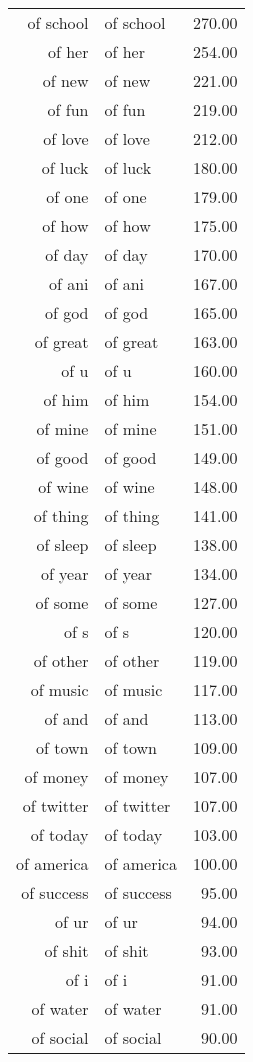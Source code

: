 \begin{table}[ht]
\begin{tabular}{rlr}
  of school & of school & 270.00 \\ 
  of her & of her & 254.00 \\ 
  of new & of new & 221.00 \\ 
  of fun & of fun & 219.00 \\ 
  of love & of love & 212.00 \\ 
  of luck & of luck & 180.00 \\ 
  of one & of one & 179.00 \\ 
  of how & of how & 175.00 \\ 
  of day & of day & 170.00 \\ 
  of ani & of ani & 167.00 \\ 
  of god & of god & 165.00 \\ 
  of great & of great & 163.00 \\ 
  of u & of u & 160.00 \\ 
  of him & of him & 154.00 \\ 
  of mine & of mine & 151.00 \\ 
  of good & of good & 149.00 \\ 
  of wine & of wine & 148.00 \\ 
  of thing & of thing & 141.00 \\ 
  of sleep & of sleep & 138.00 \\ 
  of year & of year & 134.00 \\ 
  of some & of some & 127.00 \\ 
  of s & of s & 120.00 \\ 
  of other & of other & 119.00 \\ 
  of music & of music & 117.00 \\ 
  of and & of and & 113.00 \\ 
  of town & of town & 109.00 \\ 
  of money & of money & 107.00 \\ 
  of twitter & of twitter & 107.00 \\ 
  of today & of today & 103.00 \\ 
  of america & of america & 100.00 \\ 
  of success & of success & 95.00 \\ 
  of ur & of ur & 94.00 \\ 
  of shit & of shit & 93.00 \\ 
  of i & of i & 91.00 \\ 
  of water & of water & 91.00 \\ 
  of social & of social & 90.00 \\ 

\end{tabular}
\end{table}
